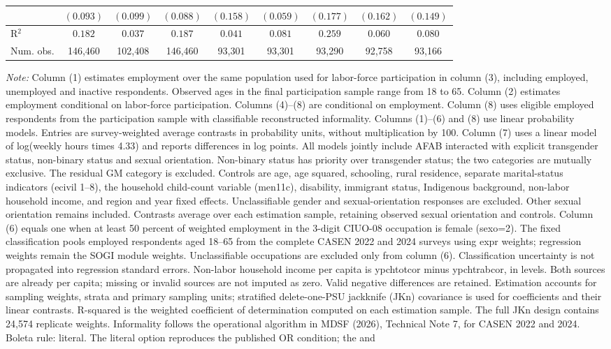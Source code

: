 \begin{table}[htpb]
{\begin{tabular}{l c c c c c c c c}
 & $(0.093)$ & $(0.099)$ & $(0.088)$ & $(0.158)$ & $(0.059)$ & $(0.177)$ & $(0.162)$ & $(0.149)$ \\
\hline
R$^2$ & $0.182$ & $0.037$ & $0.187$ & $0.041$ & $0.081$ & $0.259$ & $0.060$ & $0.080$ \\
Num. obs. & 146,460 & 102,408 & 146,460 & 93,301 & 93,301 & 93,290 & 92,758 & 93,166 \\
\hline
\end{tabular}%
}
\par\smallskip
\begin{minipage}{\textwidth}\footnotesize
\textit{Note:} Column (1) estimates employment over the same population used for labor-force participation in column (3), including employed, unemployed and inactive respondents. Observed ages in the final participation sample range from 18 to 65. Column (2) estimates employment conditional on labor-force participation. Columns (4)--(8) are conditional on employment.  Column (8) uses eligible employed respondents from the participation sample with classifiable reconstructed informality. Columns (1)--(6) and (8) use linear probability models. Entries are survey-weighted average contrasts in probability units, without multiplication by 100. Column (7) uses a linear model of log(weekly hours times 4.33) and reports differences in log points. All models jointly include AFAB interacted with explicit transgender status, non-binary status and sexual orientation. Non-binary status has priority over transgender status; the two categories are mutually exclusive. The residual GM category is excluded. Controls are age, age squared, schooling, rural residence, separate marital-status indicators (ecivil 1--8), the household child-count variable (men11c), disability, immigrant status, Indigenous background, non-labor household income, and region and year fixed effects. Unclassifiable gender and sexual-orientation responses are excluded. Other sexual orientation remains included. Contrasts average over each estimation sample, retaining observed sexual orientation and controls. Column (6) equals one when at least 50 percent of weighted employment in the 3-digit CIUO-08 occupation is female (sexo=2). The fixed classification pools employed respondents aged 18--65 from the complete CASEN 2022 and 2024 surveys using expr weights; regression weights remain the SOGI module weights. Unclassifiable occupations are excluded only from column (6). Classification uncertainty is not propagated into regression standard errors. Non-labor household income per capita is ypchtotcor minus ypchtrabcor, in levels. Both sources are already per capita; missing or invalid sources are not imputed as zero. Valid negative differences are retained. Estimation accounts for sampling weights, strata and primary sampling units; stratified delete-one-PSU jackknife (JKn) covariance is used for coefficients and their linear contrasts. R-squared is the weighted coefficient of determination computed on each estimation sample. The full JKn design contains 24,574 replicate weights. Informality follows the operational algorithm in MDSF (2026), Technical Note 7, for CASEN 2022 and 2024. Boleta rule: literal. The literal option reproduces the published OR condition; the and 
\end{minipage}
\end{table}

